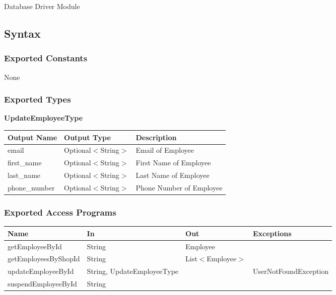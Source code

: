 \documentclass[12pt, titlepage]{article}
\begin{document}
Database Driver Module

\subsection{Syntax}

\subsubsection{Exported Constants}

None

\subsubsection{Exported Types}

\textbf{UpdateEmployeeType}

\begin{table}[H]
	\begin{tabular}{|p{}|p{}|p{}|}
		\hline
		\textbf{Output Name} & \textbf{Output Type} & \textbf{Description}     \\
		\hline
		email                & Optional$<$String$>$ & Email of Employee        \\
		\hline
		first\_name          & Optional$<$String$>$ & First Name of Employee   \\
		\hline
		last\_name           & Optional$<$String$>$ & Last Name of Employee    \\
		\hline
		phone\_number        & Optional$<$String$>$ & Phone Number of Employee \\
		\hline
	\end{tabular}
\end{table}

\subsubsection{Exported Access Programs}

\begin{center}
	\begin{adjustbox}{width=\textwidth}
		\begin{tabular}{llll}
			\hline
			\textbf{Name}        & \textbf{In}                & \textbf{Out}       & \textbf{Exceptions}   \\
			\hline
			getEmployeeById      & String                     & Employee           & ~                     \\
			getEmployeesByShopId & String                     & List$<$Employee$>$ & ~                     \\
			updateEmployeeById   & String, UpdateEmployeeType & ~                  & UserNotFoundException \\
			suspendEmployeeById  & String                     & ~                  & ~                     \\
			\hline
		\end{tabular}
	\end{adjustbox}
\end{center}
\end{document}

